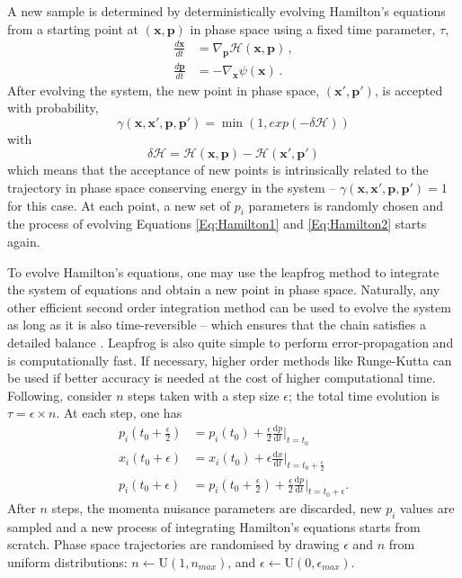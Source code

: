 \qquad A new sample is determined by deterministically evolving Hamilton's equations from a starting point at $(\bm{x},\bm{p})$ in phase space using a fixed time parameter, $\tau$,
\begin{align}
    \label{Eq:Hamilton1}
    \frac{d\bm{x}}{dt} & = \nabla_{\bm{p}}\mathcal{H}(\bm{x},\bm{p})\, , \\
    \label{Eq:Hamilton2}
    \frac{d\bm{p}}{dt} & = -\nabla_{\bm{x}}\psi(\bm{x}) \, .
\end{align}
After evolving the system, the new point in phase space, $(\bm{x}',\bm{p}')$, is accepted with probability,
\begin{equation}
    \gamma(\bm{x}, \bm{x}', \bm{p}, \bm{p}') = \min(1, exp(-\delta\mathcal{H}))
\end{equation}
with
\begin{equation}
\delta\mathcal{H} = \mathcal{H}(\bm{x}, \bm{p}) - \mathcal{H}(\bm{x}', \bm{p}')    
\end{equation}
which means that the acceptance of new points is intrinsically related to the trajectory in phase space conserving energy in the system -- $\gamma(\bm{x}, \bm{x}', \bm{p}, \bm{p}') = 1$ for this case. At each point, a new set of $p_i$ parameters is randomly chosen and the process of evolving Equations \eqref{Eq:Hamilton1} and \eqref{Eq:Hamilton2} starts again.

\qquad To evolve Hamilton's equations, one may use the leapfrog method \citep{Neal1996,SreeThesis,2013-GuidedHamiltonian} to integrate the system of equations and obtain a new point in phase space. Naturally, any other efficient second order integration method can be used to evolve the system as long as it is also time-reversible -- which ensures that the chain satisfies a detailed balance \citep{2013-GuidedHamiltonian}. Leapfrog is also quite simple to perform error-propagation and is computationally fast. If necessary, higher order methods like Runge-Kutta can be used if better accuracy is needed at the cost of higher computational time. Following, consider $n$ steps taken with a step size $\epsilon$; the total time evolution is $\tau = \epsilon\times n$. At each step, one has
\begin{align}
\label{eqn::ch1_leap_forg_scalar_1}
p_i\left(t_0+\frac{\epsilon}{2}\right) & = p_i(t_0)+\frac{\epsilon}{2}\frac{\mathrm{d}p}{\mathrm{d}t}\Big|_{t=t_0} \\
\label{eqn::ch1_leap_forg_scalar_2}
x_i(t_0+\epsilon) &= x_i(t_0)+\epsilon\frac{\mathrm{d}x}{\mathrm{d}t}\Big|_{t=t_0+\frac{\epsilon}{2} }\\
\label{eqn::ch1_leap_forg_scalar_3}
p_i(t_0+\epsilon) & = p_i\left(t_0+\frac{\epsilon}{2}\right)+\frac{\epsilon}{2}\frac{\mathrm{d}p}{\mathrm{d}t}\Big|_{t=t_0+\epsilon}.
\end{align}
After $n$ steps, the momenta nuisance parameters are discarded, new $p_i$ values are sampled and a new process of integrating Hamilton's equations starts from scratch. Phase space trajectories are randomised by drawing $\epsilon$ and $n$ from uniform distributions: $ n \leftarrow \mathrm{U}(1,n_{max})$, and $\epsilon \leftarrow \mathrm{U}(0,\epsilon_{max})$.

